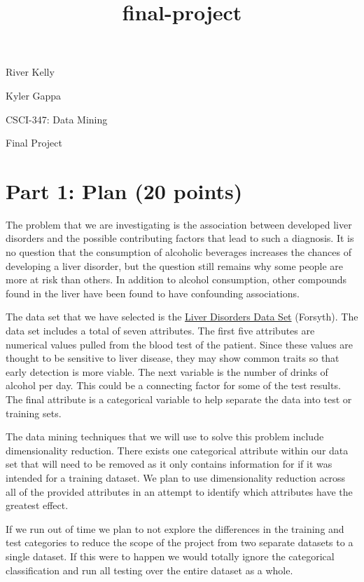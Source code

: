 \documentclass[11pt]{article}
\title{final-project}
\begin{document}
    
    \maketitle
    
    

    
    River Kelly

Kyler Gappa

CSCI-347: Data Mining

Final Project

    \hypertarget{part-1-plan-20-points}{%
\section{Part 1: Plan (20 points)}\label{part-1-plan-20-points}}

    The problem that we are investigating is the association between
developed liver disorders and the possible contributing factors that
lead to such a diagnosis. It is no question that the consumption of
alcoholic beverages increases the chances of developing a liver
disorder, but the question still remains why some people are more at
risk than others. In addition to alcohol consumption, other compounds
found in the liver have been found to have confounding associations.

The data set that we have selected is the
\href{https://archive.ics.uci.edu/ml/datasets/Liver+Disorders}{Liver
Disorders Data Set} (Forsyth). The data set includes a total of seven
attributes. The first five attributes are numerical values pulled from
the blood test of the patient. Since these values are thought to be
sensitive to liver disease, they may show common traits so that early
detection is more viable. The next variable is the number of drinks of
alcohol per day. This could be a connecting factor for some of the test
results. The final attribute is a categorical variable to help separate
the data into test or training sets.

The data mining techniques that we will use to solve this problem
include dimensionality reduction. There exists one categorical attribute
within our data set that will need to be removed as it only contains
information for if it was intended for a training dataset. We plan to
use dimensionality reduction across all of the provided attributes in an
attempt to identify which attributes have the greatest effect.

If we run out of time we plan to not explore the differences in the
training and test categories to reduce the scope of the project from two
separate datasets to a single dataset. If this were to happen we would
totally ignore the categorical classification and run all testing over
the entire dataset as a whole.
\end{document}
